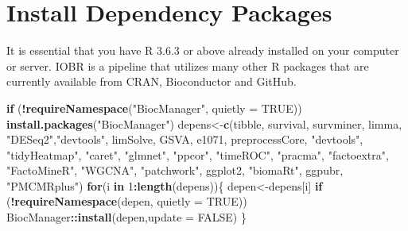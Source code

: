 \documentclass[
  12pt,
]{book}
\newenvironment{Shaded}{\begin{snugshade}}{\end{snugshade}}
\newcommand{\AttributeTok}[1]{\textcolor[rgb]{0.13,0.29,0.53}{#1}}
\newcommand{\ConstantTok}[1]{\textcolor[rgb]{0.56,0.35,0.01}{#1}}
\newcommand{\ControlFlowTok}[1]{\textcolor[rgb]{0.13,0.29,0.53}{\textbf{#1}}}
\newcommand{\DecValTok}[1]{\textcolor[rgb]{0.00,0.00,0.81}{#1}}
\newcommand{\FunctionTok}[1]{\textcolor[rgb]{0.13,0.29,0.53}{\textbf{#1}}}
\newcommand{\NormalTok}[1]{#1}
\newcommand{\OtherTok}[1]{\textcolor[rgb]{0.56,0.35,0.01}{#1}}
\newcommand{\SpecialCharTok}[1]{\textcolor[rgb]{0.81,0.36,0.00}{\textbf{#1}}}
\newcommand{\StringTok}[1]{\textcolor[rgb]{0.31,0.60,0.02}{#1}}
\begin{document}
\hypertarget{install-dependency-packages}{%
\section{Install Dependency Packages}\label{install-dependency-packages}}

It is essential that you have R 3.6.3 or above already installed on your computer or server. IOBR is a pipeline that utilizes many other R packages that are currently available from CRAN, Bioconductor and GitHub.

\begin{Shaded}
\begin{Highlighting}[]
\ControlFlowTok{if}\NormalTok{ (}\SpecialCharTok{!}\FunctionTok{requireNamespace}\NormalTok{(}\StringTok{"BiocManager"}\NormalTok{, }\AttributeTok{quietly =} \ConstantTok{TRUE}\NormalTok{)) }\FunctionTok{install.packages}\NormalTok{(}\StringTok{"BiocManager"}\NormalTok{)}
\NormalTok{depens}\OtherTok{\textless{}{-}}\FunctionTok{c}\NormalTok{(}\StringTok{\textquotesingle{}tibble\textquotesingle{}}\NormalTok{, }\StringTok{\textquotesingle{}survival\textquotesingle{}}\NormalTok{, }\StringTok{\textquotesingle{}survminer\textquotesingle{}}\NormalTok{, }\StringTok{\textquotesingle{}limma\textquotesingle{}}\NormalTok{, }\StringTok{"DESeq2"}\NormalTok{,}\StringTok{"devtools"}\NormalTok{, }\StringTok{\textquotesingle{}limSolve\textquotesingle{}}\NormalTok{, }\StringTok{\textquotesingle{}GSVA\textquotesingle{}}\NormalTok{, }\StringTok{\textquotesingle{}e1071\textquotesingle{}}\NormalTok{, }\StringTok{\textquotesingle{}preprocessCore\textquotesingle{}}\NormalTok{, }
          \StringTok{"devtools"}\NormalTok{, }\StringTok{"tidyHeatmap"}\NormalTok{, }\StringTok{"caret"}\NormalTok{, }\StringTok{"glmnet"}\NormalTok{, }\StringTok{"ppcor"}\NormalTok{,  }\StringTok{"timeROC"}\NormalTok{, }\StringTok{"pracma"}\NormalTok{, }\StringTok{"factoextra"}\NormalTok{, }
          \StringTok{"FactoMineR"}\NormalTok{, }\StringTok{"WGCNA"}\NormalTok{, }\StringTok{"patchwork"}\NormalTok{, }\StringTok{\textquotesingle{}ggplot2\textquotesingle{}}\NormalTok{, }\StringTok{"biomaRt"}\NormalTok{, }\StringTok{\textquotesingle{}ggpubr\textquotesingle{}}\NormalTok{, }\StringTok{"PMCMRplus"}\NormalTok{)}
\ControlFlowTok{for}\NormalTok{(i }\ControlFlowTok{in} \DecValTok{1}\SpecialCharTok{:}\FunctionTok{length}\NormalTok{(depens))\{}
\NormalTok{  depen}\OtherTok{\textless{}{-}}\NormalTok{depens[i]}
  \ControlFlowTok{if}\NormalTok{ (}\SpecialCharTok{!}\FunctionTok{requireNamespace}\NormalTok{(depen, }\AttributeTok{quietly =} \ConstantTok{TRUE}\NormalTok{))  BiocManager}\SpecialCharTok{::}\FunctionTok{install}\NormalTok{(depen,}\AttributeTok{update =} \ConstantTok{FALSE}\NormalTok{)}
\NormalTok{\}}
\end{Highlighting}
\end{Shaded}
\end{document}
